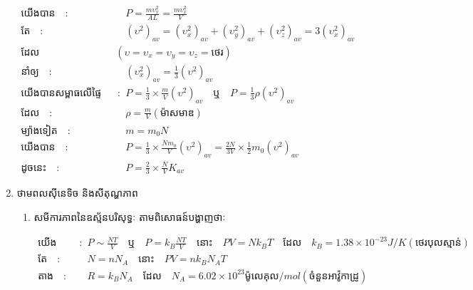 \documentclass[12pt, a4paper]{article}
\begin{document}
\begin{enumerate}[I]
\begin{align*}
		\text{យើងបាន}\quad :&\quad P=\frac{m\upsilon^{2}_{x}}{AL}=\frac{m\upsilon^{2}_{x}}{V}\\
		\text{តែ}\quad :&\quad \left(\upsilon^{2}\right)_{av}=\left(\upsilon^{2}_{x}\right)_{av}+\left(\upsilon^{2}_{y}\right)_{av}+\left(\upsilon^{2}_{z}\right)_{av}=3\left(\upsilon^{2}_{x}\right)_{av}\\\text{ដែល}\quad & \left(\upsilon=\upsilon_{x}=\upsilon_{y}=\upsilon_{z}=\text{ថេរ}\right)\\
		\text{នាំឲ្យ}\quad :&\quad \left(\upsilon^2_{x}\right)_{av}=\frac{1}{3}\left(\upsilon^2\right)_{av}\\
		\text{យើងបានសម្ពាធលើផ្ទៃខាងនីមួយៗ កំណត់ដោយៈ}\quad :&\quad P=\frac{1}{3}\times\frac{m}{V}\left(\upsilon^{2}\right)_{av}\quad \text{ឬ}\quad P=\frac{1}{3}\rho\left(\upsilon^{2}\right)_{av}\\
		\text{ដែល}\quad :&\quad \rho =\frac{m}{V}\left(\text{ម៉ាសមាឌ}\right)\\
		\text{ម្យ៉ាងទៀត}\quad :&\quad m=m_{0}N\\
		\text{យើងបាន}\quad :&\quad P=\frac{1}{3}\times\frac{Nm_{0}}{V}\left(\upsilon^{2}\right)_{av}=\frac{2N}{3V}\times\frac{1}{2}m_{0}\left(\upsilon^2\right)_{av}\\
		\text{ដូចនេះ}\quad :&\quad P=\frac{2}{3}\times\frac{N}{V}K_{av}
	\end{align*}
	\item {\kml ថាមពលសុីនេទិច និងសីតុណ្ហភាព}
	\begin{enumerate}[m]
		\item {\kml សមីការភាពនៃឧស្ម័នបរិសុទ្ធៈ} តាមពិសោធន៍បង្ហាញថាៈ
		\begin{itemize}
		\end{itemize}
	\begin{align*}
		\text{យើងបាន}\quad :& \quad P\sim \frac{NT}{V}\quad \text{ឬ}\quad P=k_{B}\frac{NT}{V}\quad \text{នោះ}\quad PV=Nk_{B}T\quad\text{ដែល}\quad k_{B}=1.38\times10^{-23}J/K\left(\text{ថេរបុលស្មាន់}\right)\\
		\text{តែ}\quad :&\quad N=nN_{A}\quad \text{នោះ}\quad PV=nk_{B}N_{A}T\\
		\text{តាង}\quad :&\quad R=k_{B}N_{A}\quad\text{ដែល}\quad N_{A}=6.02\times10^{23}\text{ម៉ូលេគុល}/mol\left(\text{ចំនួនអាវ៉ូកាដ្រូ}\right)\\

\end{align*}
\end{enumerate}
\end{enumerate}
\end{document}

